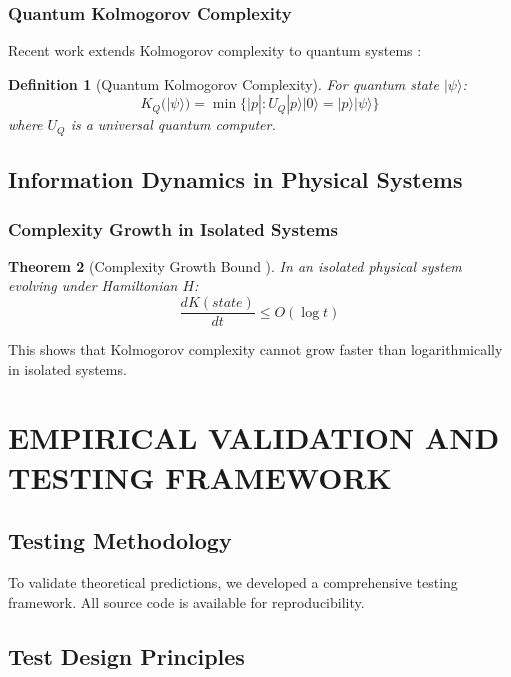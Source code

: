 \documentclass[12pt,a4paper]{report}
\newtheorem{theorem}{Theorem}[chapter]
\newtheorem{definition}[theorem]{Definition}
\begin{document}
\subsection{Quantum Kolmogorov Complexity}

Recent work extends Kolmogorov complexity to quantum systems \cite{muller2024quantum}:

\begin{definition}[Quantum Kolmogorov Complexity]
For quantum state $|\psi\rangle$:
\begin{equation}
K_Q(|\psi\rangle) = \min\{|p| : U_Q|p\rangle|0\rangle = |p\rangle|\psi\rangle\}
\end{equation}
where $U_Q$ is a universal quantum computer.
\end{definition}

\section{Information Dynamics in Physical Systems}

\subsection{Complexity Growth in Isolated Systems}

\begin{theorem}[Complexity Growth Bound \cite{schneider2021complexity}]
In an isolated physical system evolving under Hamiltonian $H$:
\begin{equation}
\frac{dK(state)}{dt} \leq O(\log t)
\end{equation}
\end{theorem}

This shows that Kolmogorov complexity cannot grow faster than logarithmically in isolated systems.

\chapter{EMPIRICAL VALIDATION AND TESTING FRAMEWORK}

\section{Testing Methodology}

To validate theoretical predictions, we developed a comprehensive testing framework. All source code is available for reproducibility.

\section{Test Design Principles}
\end{document}
